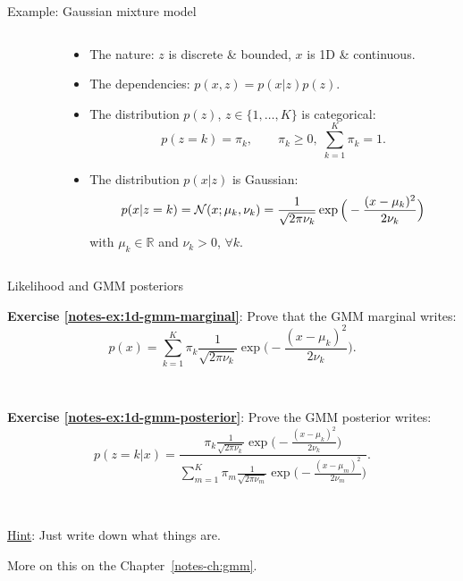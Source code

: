 \documentclass{beamer}
\newcommand{\exercise}[2]{\noindent\colorbox{blue!10}{\parbox{0.995\textwidth}{\textbf{Exercise \ref{notes-ex:#1}}: #2}}\\}
\begin{document}
\begin{frame}{Example: Gaussian mixture model}
\begin{columns}
\begin{column}{0.08\textwidth}
  \end{column}%
  \begin{column}{0.9\textwidth}
   \begin{itemize}
    \item The nature: $z$ is discrete \& bounded, $x$ is 1D \& continuous.
    \item The dependencies: $p(x,z)=p(x|z)p(z)$.
    \pause
    \item The distribution $p(z)$, $z\in\{1,\ldots,K\}$ is categorical:
    \[p(z=k) = \pi_k, \qquad \pi_k\geq 0,\; \sum_{k=1}^K \pi_k = 1.\]
    \pause
    \item The distribution $p(x|z)$ is Gaussian:
    \[p(x|z=k) = {\cal N}(x;\mu_k,\nu_k) = \frac{1}{\sqrt{2\pi\nu_k}}\exp\Big(-\frac{(x-\mu_k)^2}{2\nu_k}\Big)\]
    with $\mu_k\in\mathbb{R}$ and $\nu_k>0$, $\forall k$.
   \end{itemize}
  \end{column}
 \end{columns}
\end{frame}

\begin{frame}{Likelihood and GMM posteriors}
\exercise{1d-gmm-marginal}{Prove that the GMM marginal writes:
\[ 
p(x) = \sum_{k=1}^K \pi_k \frac{1}{\sqrt{2\pi\nu_k}}\exp\Big(-\frac{(x-\mu_k)^2}{2\nu_k}\Big).
\]
}\vspace{3mm}

\exercise{1d-gmm-posterior}{Prove the GMM posterior writes:
\[
 p(z=k|x) = \frac{\pi_k \frac{1}{\sqrt{2\pi\nu_k}}\exp\Big(-\frac{(x-\mu_k)^2}{2\nu_k}\Big)}{\sum_{m=1}^K \pi_m \frac{1}{\sqrt{2\pi\nu_m}}\exp\Big(-\frac{(x-\mu_m)^2}{2\nu_m}\Big)}.
\]
}\vspace{3mm}

\underline{Hint}: Just write down what things are.\vspace{3mm}

More on this on the Chapter~\ref{notes-ch:gmm}.
\end{frame}

%  
%  
\end{document}
